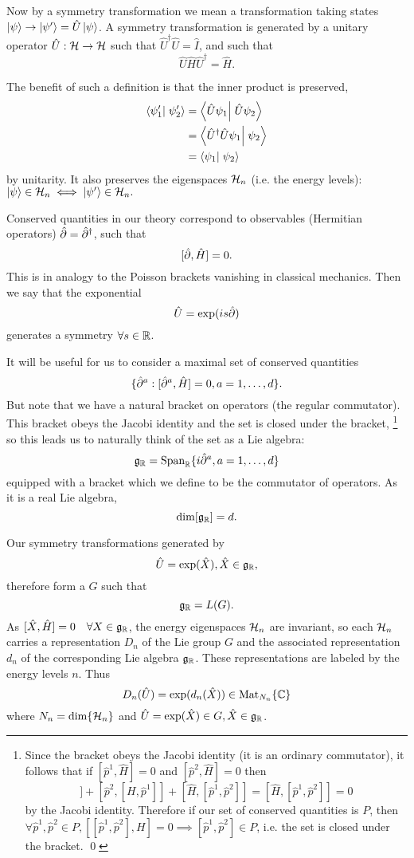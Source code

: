 Now by a symmetry transformation we mean a transformation taking states $\left| \psi \right>\to \left| \psi' \right>=\hat U \left| \psi \right>$.
A symmetry transformation is generated by a unitary operator $\hat U:\mathcal H\to \mathcal H$ such that $\hat U^\dagger \hat U = \hat I$, and such that
$$\hat U \hat H \hat U^\dagger = \hat H.$$

The benefit of such a definition is that the inner product is preserved,
\begin{align*}
    \braket{\psi_1'}{\psi_2'}&=\braket{\hat U \psi_1}{\hat U \psi_2}\\
    &=\braket{\hat U^\dagger \hat U \psi_1}{\psi_2}\\
    &=\braket{\psi_1}{\psi_2}
\end{align*}
by unitarity. It also preserves the eigenspaces $\mathcal H_n$ (i.e. the energy levels):
$\left| \psi \right> \in \mathcal H_n \iff \left| \psi' \right> \in \mathcal H_n.$

Conserved quantities in our theory correspond to observables (Hermitian operators) $\hat {\partial} = \hat {\partial}^\dagger$, such that
$$[\hat {\partial}, \hat H]=0.$$
This is in analogy to the Poisson brackets vanishing in classical mechanics. Then we say that the exponential
$$\hat U=\exp(is \hat {\partial})$$
generates a symmetry $\forall s\in \mathbb{R}$.

It will be useful for us to consider a maximal set of conserved quantities
$$\{\hat {\partial}^a:[\hat {\partial}^a,\hat H]=0, a=1,\ldots,d\}.$$
But note that we have a natural bracket on operators (the regular commutator). This bracket obeys the Jacobi identity and the set is closed under the bracket,
\footnote{Since the bracket obeys the Jacobi identity (it is an ordinary commutator), it follows that if $[\hat p^1,\hat H]=0$ and $[\hat p^2, \hat H]=0$ then
\begin{equation*}
    [\hat p^1,[\hat p^2,H]]+[\hat p^2,[H,\hat p^1]]+[\hat H,[\hat p^1, \hat p^2]]=[\hat H,[\hat p^1, \hat p^2]]=0
\end{equation*}
by the Jacobi identity. Therefore if our set of conserved quantities is $P$, then $\forall \hat p^1, \hat p^2 \in P, [[\hat p^1,\hat p^2],H]=0 \implies [\hat p^1, \hat p^2]\in P$, i.e. the set is closed under the bracket. \qed}
so this leads us to naturally think of the set as a Lie algebra:
$$\mathfrak{g}_{\mathbb{R}} =\text{Span}_{\mathbb{R}} \{i \hat {\partial}^a, a=1,\ldots,d\}$$
equipped with a bracket which we define to be the commutator of operators. As it is a real Lie algebra,
$$\dim[\mathfrak{g}_{\mathbb{R}}]=d.$$

Our symmetry transformations generated by
$$\hat U = \exp(\hat X), \hat X \in \mathfrak{g}_{\mathbb{R}},$$
therefore form a  $G$ such that $$\mathfrak{g}_{\mathbb{R}}= L(G).$$
As $[\hat X,\hat H]=0 \quad \forall X\in \mathfrak{g}_{\mathbb{R}}$, the energy eigenspaces $\mathcal H_n$ are invariant, so each $\mathcal H_n$ carries a representation $D_n$ of the Lie group $G$ and the associated representation $d_n$ of the corresponding Lie algebra $\mathfrak{g}_{\mathbb{R}}$. These representations are labeled by the energy levels $n$. Thus
$$D_n(\hat U)=\exp(d_n(\hat X))\in \text{Mat}_{N_n}\{\mathbb{C}\}$$ where $N_n=\dim\{\mathcal H_n\}$ and $\hat U= \exp(\hat X)\in G, \hat X \in \mathfrak{g}_{\mathbb{R}}$.

